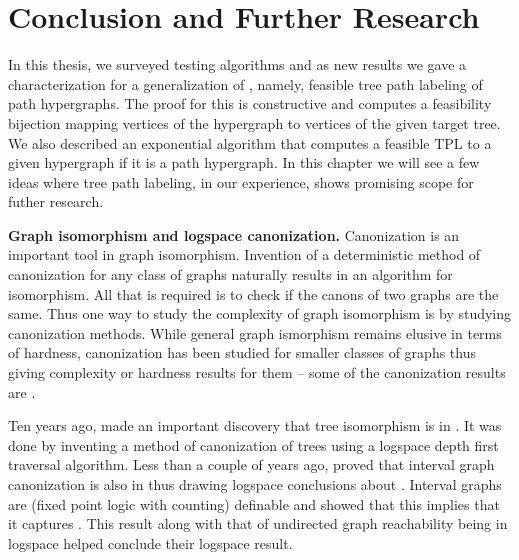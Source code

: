 \xclearpage

\chapter[Conclusion]{Conclusion and Further Research}
\label{ch:conclusion}

In this thesis, we surveyed \cop testing algorithms and as new results
we gave a characterization for a generalization of \COP, namely,
feasible tree path labeling of path hypergraphs. The proof for this is
constructive and computes a feasibility bijection mapping vertices of
the hypergraph to vertices of the given target tree. We also described
an exponential algorithm that computes a feasible TPL to a given
hypergraph if it is a path hypergraph.  In this chapter we will see a
few ideas where tree path labeling, in our experience, shows promising
scope for futher research.

\parindent 0pt

\textbf{Graph isomorphism and logspace canonization.}  Canonization is
an important tool in graph isomorphism. Invention of a deterministic
method of canonization for any class of graphs naturally results in an
algorithm for isomorphism. All that is required is to check if the
canons of two graphs are the same. Thus one way to study the
complexity of graph isomorphism is by studying canonization
methods. While general graph ismorphism remains elusive in terms of
hardness, canonization has been studied for smaller classes of graphs
thus giving complexity or hardness results for them -- some of the
canonization results are \cite{sl92,dlntw09,adkk09,kklv10}.

Ten years ago, \cite{sl92} made an important discovery that tree
isomorphism is in \logspace. It was done by inventing a method of
canonization of trees using a logspace depth first traversal
algorithm.  Less than a couple of years ago, \cite{kklv10} proved that
interval graph canonization is also in \logspace thus drawing logspace
conclusions about \COT. Interval graphs are \fpplusc (fixed point
logic with counting) definable and \cite{l10} showed that this implies
that it captures \ptime. This result along with that of undirected
graph reachability being in logspace \cite{rei08} helped \cite{kklv10}
conclude their logspace result.

